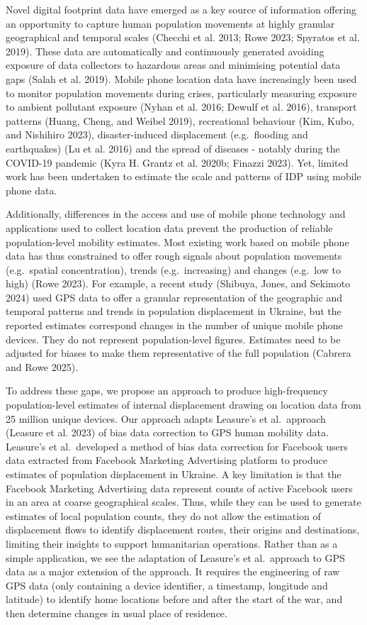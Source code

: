 \documentclass[
  sn-nature,
  11pt,
]{sn-jnl}
\begin{document}
Novel digital footprint data have emerged as a key source of information
offering an opportunity to capture human population movements at highly
granular geographical and temporal scales (Checchi et al. 2013; Rowe
2023; Spyratos et al. 2019). These data are automatically and
continuously generated avoiding exposure of data collectors to hazardous
areas and minimising potential data gaps (Salah et al. 2019). Mobile
phone location data have increasingly been used to monitor population
movements during crises, particularly measuring exposure to ambient
pollutant exposure (Nyhan et al. 2016; Dewulf et al. 2016), transport
patterns (Huang, Cheng, and Weibel 2019), recreational behaviour (Kim,
Kubo, and Nishihiro 2023), disaster-induced displacement (e.g.~flooding
and earthquakes) (Lu et al. 2016) and the spread of diseases - notably
during the COVID-19 pandemic (Kyra H. Grantz et al. 2020b; Finazzi
2023). Yet, limited work has been undertaken to estimate the scale and
patterns of IDP using mobile phone data.

Additionally, differences in the access and use of mobile phone
technology and applications used to collect location data prevent the
production of reliable population-level mobility estimates. Most
existing work based on mobile phone data has thus constrained to offer
rough signals about population movements (e.g.~spatial concentration),
trends (e.g.~increasing) and changes (e.g.~low to high) (Rowe 2023). For
example, a recent study (Shibuya, Jones, and Sekimoto 2024) used GPS
data to offer a granular representation of the geographic and temporal
patterns and trends in population displacement in Ukraine, but the
reported estimates correspond changes in the number of unique mobile
phone devices. They do not represent population-level figures. Estimates
need to be adjusted for biases to make them representative of the full
population (Cabrera and Rowe 2025).

To address these gaps, we propose an approach to produce high-frequency
population-level estimates of internal displacement drawing on location
data from 25 million unique devices. Our approach adapts Leasure's et
al.~approach (Leasure et al. 2023) of bias data correction to GPS human
mobility data. Leasure's et al.~developed a method of bias data
correction for Facebook users data extracted from Facebook Marketing
Advertising platform to produce estimates of population displacement in
Ukraine. A key limitation is that the Facebook Marketing Advertising
data represent counts of active Facebook users in an area at coarse
geographical scales. Thus, while they can be used to generate estimates
of local population counts, they do not allow the estimation of
displacement flows to identify displacement routes, their origins and
destinations, limiting their insights to support humanitarian
operations. Rather than as a simple application, we see the adaptation
of Leasure's et al.~approach to GPS data as a major extension of the
approach. It requires the engineering of raw GPS data (only containing a
device identifier, a timestamp, longitude and latitude) to identify home
locations before and after the start of the war, and then determine
changes in usual place of residence.
\end{document}
